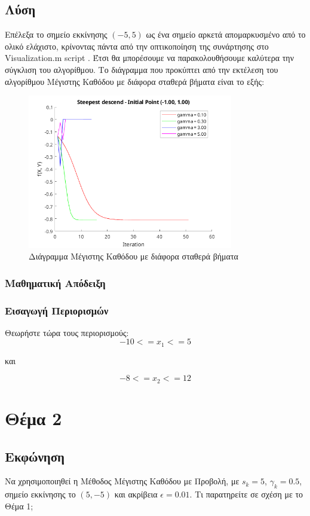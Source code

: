 \documentclass{report}
\begin{document}
\section{Λύση}
Επέλεξα το σημείο εκκίνησης $(-5,5)$ ως ένα σημείο αρκετά απομαρκυσμένο από το ολικό ελάχιστο, 
κρίνοντας πάντα από την οπτικοποίηση της συνάρτησης στο Visualization.m script
. Έτσι θα μπορέσουμε να παρακολουθήσουμε καλύτερα την σύγκλιση του αλγορίθμου.
Το διάγραμμα που προκύπτει από την εκτέλεση του αλγορίθμου Μέγιστης Καθόδου με διάφορα σταθερά βήματα 
είναι το εξής:
\begin{figure}[H]
    \centering
    \includegraphics[width=0.8\textwidth]{media/thema1.png}
    \caption{Διάγραμμα Μέγιστης Καθόδου με διάφορα σταθερά βήματα}
\end{figure}

\subsection{Μαθηματική Απόδειξη}


\subsection{Εισαγωγή Περιορισμών}
Θεωρήστε τώρα τους περιορισμούς:
$$-10 <= x_1 <= 5$$  
\begin{center}
    και
\end{center}
$$-8 <= x_2 <= 12$$

% 
\chapter{Θέμα 2}
\section{Εκφώνηση}
Να χρησιμοποιηθεί η Μέθοδος Μέγιστης Καθόδου με Προβολή, με $s_k = 5$, $\gamma_k = 0.5$,
σημείο εκκίνησης το $(5, -5)$ και ακρίβεια $\epsilon = 0.01$. Τι παρατηρείτε σε σχέση με το 
Θέμα 1;
\end{document}
